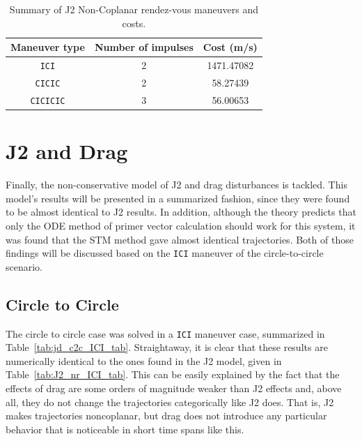 \begin{table}[htbp]
    \centering
    \begin{tabular}{ccc} \toprule
        Maneuver type & Number of impulses & Cost (m/s) \\ \midrule
        \texttt{ICI} & 2 & 1471.47082 \\
        \texttt{CICIC} & 2 & 58.27439 \\
        \texttt{CICICIC} & 3 & 56.00653 \\\bottomrule
    \end{tabular}
    \caption{Summary of J2 Non-Coplanar rendez-vous maneuvers and costs.}
    \label{tab:J2_nr_summary}
\end{table}

\newpage
\FloatBarrier
\section{J2 and Drag}

Finally, the non-conservative model of J2 and drag disturbances is tackled. This model's results will be presented in a summarized fashion, since they were found to be almost identical to J2 results. In addition, although the theory predicts that only the ODE method of primer vector calculation should work for this system, it was found that the STM method gave almost identical trajectories. Both of those findings will be discussed based on the \texttt{ICI} maneuver of the circle-to-circle scenario.

\subsection{Circle to Circle}

The circle to circle case was solved in a \texttt{ICI} maneuver case, summarized in Table~\ref{tab:jd_c2c_ICI_tab}. Straightaway, it is clear that these results are numerically identical to the ones found in the J2 model, given in Table~\ref{tab:J2_nr_ICI_tab}. This can be easily explained by the fact that the effects of drag are some orders of magnitude weaker than J2 effects and, above all, they do not change the trajectories categorically like J2 does. That is, J2 makes trajectories noncoplanar, but drag does not introduce any particular behavior that is noticeable in short time spans like this.
    
